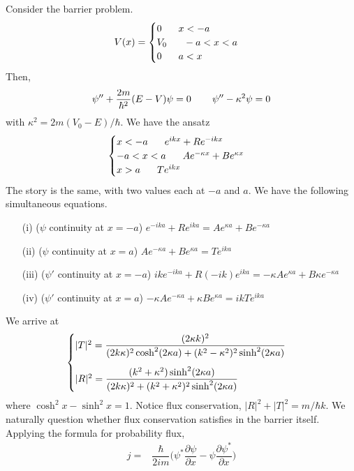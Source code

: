 \vspace{2ex}
\begin{thm}
Consider the barrier problem.
\[V(x)=\begin{cases}
0\hspace{4ex}x<-a\\
V_0\hspace{4ex}-a<x<a\\
0\hspace{4ex}a<x
\end{cases}\]
Then,
\[\psi ''+\dfrac{2m}{\hbar ^2}(E-V)\psi =0\hspace{5ex}\psi ''-\kappa ^2\psi =0\]
with $\kappa ^2=2m(V_0-E)/\hbar $.
We have the ansatz
\[\begin{cases}
x< -a\hspace{4ex}e^{ikx}+Re^{-ikx}\\
-a<x<a\hspace{4ex}Ae^{-\kappa x}+Be^{\kappa x}\\
x>a\hspace{4ex}Te^{ik x}
\end{cases}\]
The story is the same, with two values each at $-a$ and $a$. We have the following simultaneous equations.
\begin{itemize}
\item[(i)] ($\psi $ continuity at $x=-a$) $e^{-ika}+Re^{ika}=Ae^{\kappa a}+Be^{-\kappa a}$
\item[(ii)] ($\psi $ continuity at $x=a$) $Ae^{-\kappa a}+Be^{\kappa a}=Te^{ik a}$
\item[(iii)] ($\psi '$ continuity at $x=-a$) $ike^{-ika}+R(-ik)e^{ika}=-\kappa Ae^{\kappa a}+B\kappa e^{-\kappa a}$
\item[(iv)] ($\psi '$ continuity at $x=a$) $-\kappa Ae^{-\kappa a}+\kappa Be^{\kappa a}=ikTe^{ika}$
\end{itemize}
We arrive at
\[\begin{cases}
\vspace{2ex}
|T|^2=\dfrac{(2\kappa k)^2}{(2k\kappa )^2\cosh ^2(2\kappa a)+(k^2-\kappa ^2)^2\sinh ^2(2\kappa a)}\\
|R|^2=\dfrac{(k^2+\kappa ^2)\sinh ^2(2\kappa a)}{(2k\kappa )^2+(k^2+\kappa ^2)^2\sinh ^2(2\kappa  a)}
\end{cases}\]
where $\cosh^2x -\sinh ^2x=1 $. Notice flux conservation, $|R|^2+|T|^2=m/\hbar k$. We naturally question whether flux conservation satisfies in the barrier itself. Applying the formula for probability flux,
\begin{align*}
j=&\dfrac{\hbar }{2im}\Big(\psi ^{*}\dfrac{\partial \psi }{\partial x}-\psi \dfrac{\partial \psi ^{*}}{\partial x}\Big)\\

\end{align*}
\end{thm}
